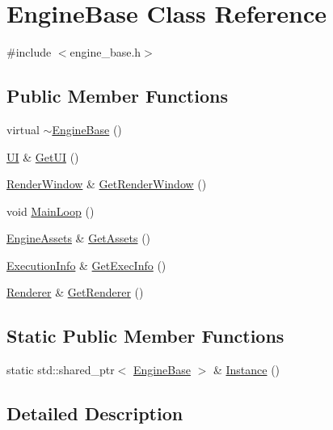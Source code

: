 \hypertarget{class_engine_base}{}\section{Engine\+Base Class Reference}
\label{class_engine_base}


{\ttfamily \#include $<$engine\+\_\+base.\+h$>$}

\subsection*{Public Member Functions}
\begin{DoxyCompactItemize}
\item 
virtual \hyperlink{class_engine_base_a7ff76df0b36e49c52f5f9b3d902f2ed8}{$\sim$\+Engine\+Base} ()
\item 
\hyperlink{class_u_i}{U\+I} \& \hyperlink{class_engine_base_a6f17c1edf30de726cd5d27c52ee5187e}{Get\+U\+I} ()
\item 
\hyperlink{class_render_window}{Render\+Window} \& \hyperlink{class_engine_base_a18f54a478e5fb1466a03f52d586e4c83}{Get\+Render\+Window} ()
\item 
void \hyperlink{class_engine_base_acfac8e6ca7e296f89a7378d56021fb26}{Main\+Loop} ()
\item 
\hyperlink{class_engine_assets}{Engine\+Assets} \& \hyperlink{class_engine_base_a4bc838b2ff2773533ce6d1bc081fc2cb}{Get\+Assets} ()
\item 
\hyperlink{class_execution_info}{Execution\+Info} \& \hyperlink{class_engine_base_afb6903df843953455d65eb3a047b8bb3}{Get\+Exec\+Info} ()
\item 
\hyperlink{class_renderer}{Renderer} \& \hyperlink{class_engine_base_a6d6b7e5a62b77c0c2d8fd0d7da4c37cf}{Get\+Renderer} ()
\end{DoxyCompactItemize}
\subsection*{Static Public Member Functions}
\begin{DoxyCompactItemize}
\item 
static std\+::shared\+\_\+ptr$<$ \hyperlink{class_engine_base}{Engine\+Base} $>$ \& \hyperlink{class_engine_base_a9f5ab8d134491f17010a3c9d45f1db3c}{Instance} ()
\end{DoxyCompactItemize}


\subsection{Detailed Description}


